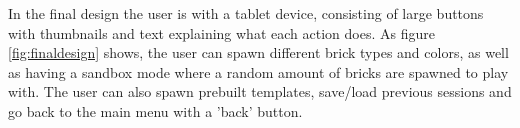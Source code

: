 In the final design the user is with a tablet device, consisting of large buttons with thumbnails and text explaining what each action does. As figure \ref{fig:finaldesign} shows, the user can spawn different brick types and colors, as well as having a sandbox mode where a random amount of bricks are spawned to play with. The user can also spawn prebuilt templates, save/load previous sessions and go back to the main menu with a 'back' button. 

